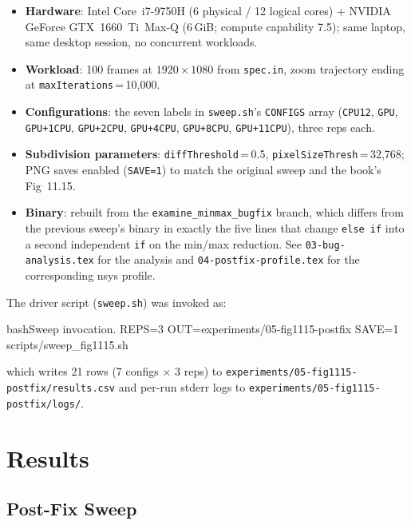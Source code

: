 \documentclass[
	english,
	letterpaper, oneside
]{article}
\begin{document}
\begin{itemize}
    \item \textbf{Hardware}: Intel Core~i7-9750H (6 physical / 12 logical
    cores) + NVIDIA GeForce GTX~1660~Ti~Max-Q (6\,GiB; compute
    capability 7.5); same laptop, same desktop session, no concurrent
    workloads.
    \item \textbf{Workload}: 100 frames at $1920 \times 1080$ from
    \texttt{spec.in}, zoom trajectory ending at
    \texttt{maxIterations}\,=\,10{,}000.
    \item \textbf{Configurations}: the seven labels in
    \texttt{sweep.sh}'s \texttt{CONFIGS} array
    (\texttt{CPU12}, \texttt{GPU}, \texttt{GPU+1CPU},
    \texttt{GPU+2CPU}, \texttt{GPU+4CPU}, \texttt{GPU+8CPU},
    \texttt{GPU+11CPU}), three reps each.
    \item \textbf{Subdivision parameters}:
    \texttt{diffThreshold}\,=\,0.5, \texttt{pixelSizeThresh}\,=\,32{,}768;
    PNG saves enabled (\texttt{SAVE=1}) to match the original sweep and
    the book's Fig~11.15.
    \item \textbf{Binary}: rebuilt from the \texttt{examine\_minmax\_bugfix}
    branch, which differs from the previous sweep's binary in exactly the
    five lines that change \texttt{else if} into a second independent
    \texttt{if} on the min/max reduction. See \texttt{03-bug-analysis.tex} for
    the analysis and \texttt{04-postfix-profile.tex} for the corresponding
    nsys profile.
\end{itemize}

\noindent
The driver script (\texttt{sweep.sh}) was invoked as:

\begin{sourcecode}{bash}{Sweep invocation.}
REPS=3 OUT=experiments/05-fig1115-postfix SAVE=1 scripts/sweep_fig1115.sh
\end{sourcecode}

\noindent
which writes 21 rows (7 configs $\times$ 3 reps) to
\texttt{experiments/05-fig1115-postfix/results.csv} and per-run stderr logs to
\texttt{experiments/05-fig1115-postfix/logs/}.

\section{Results}

\subsection{Post-Fix Sweep}
\end{document}
